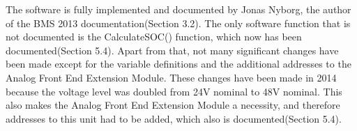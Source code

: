 The software is fully implemented and documented by Jonas Nyborg, the author of the BMS 2013 documentation\cite{BMSDocumentation}(Section 3.2). The only software function that is not documented is the CalculateSOC() function, which now has been documented\cite{AU2}(Section 5.4). Apart from that, not many significant changes have been made except for the variable definitions and the additional addresses to the Analog Front End Extension Module. These changes have been made in 2014 because the voltage level was doubled from 24V nominal to 48V nominal. This also makes the Analog Front End Extension Module a necessity, and therefore addresses to this unit had to be added, which also is documented\cite{AU2}(Section 5.4).   